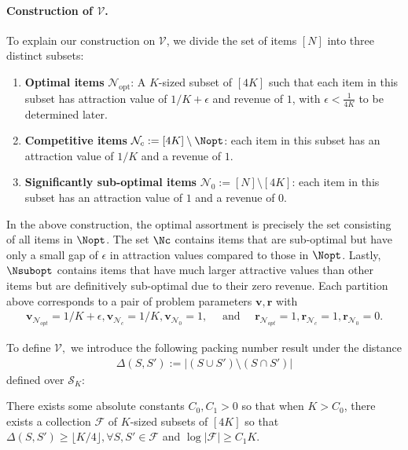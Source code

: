 \documentclass[10pt, letterpaper]{article}
\begin{document}
\paragraph{Construction of $\mathcal{V}$.} To explain our construction on $\mathcal{V}$, we divide the set of items $[N]$ into three distinct subsets:
\begin{enumerate}
    \item \textbf{Optimal items} $\mathcal{N}_{\text{opt}}$:  A $K$-sized subset of $[4K]$ such that each item in this subset has attraction value of $1/K + \epsilon$ and revenue of $1$, with $\epsilon <\frac{1}{4K}$ to be determined later.
    \item \textbf{Competitive items} $\mathcal{N}_{c} := [4K]\setminus \Nopt$: each item in this subset has an attraction value of $1/K$ and a revenue of $1$.
    \item \textbf{Significantly sub-optimal items} $\mathcal{N}_{0} := [N] \setminus [4K]$: each item in this subset has an attraction value of $1$ and a revenue of $0$.
\end{enumerate}
In the above construction, the optimal assortment is precisely the set consisting of all items in $\Nopt$. The set $\Nc$ contains items that are sub-optimal but have only a small gap of $\epsilon$ in attraction values compared to those in $\Nopt$. Lastly, $\Nsubopt$ contains items that have much larger attractive values than other items but are definitively sub-optimal due to their zero revenue. Each partition above corresponds to a pair of problem parameters $\bm v, \bm r$ with \begin{align*}
    \bm{v}_{\mathcal{N}_{opt}} = 1/K+\epsilon,   \bm{v}_{\mathcal{N}_{c}} = 1/K, \bm{v}_{\mathcal{N}_0} = 1,\quad \text{ and }\quad \bm{r}_{\mathcal{N}_{opt}} = 1,   \bm{r}_{\mathcal{N}_{c}} = 1, \bm{r}_{\mathcal{N}_0} = 0. 
\end{align*}


To define $\mathcal{V},$ we introduce the following packing number result under the distance 
\begin{align}\label{eq-dist-Delta}
\Delta(S,S'):= \lvert (S \cup S') \setminus (S\cap S') \rvert
\end{align}
defined over $\mathcal{S}_K:$
\begin{lemma}\label{lem-packing-number}
    There exists some absolute constants $C_0,C_1>0$ so that when $K>C_0$, there exists a collection $\mathcal{F}$ of $K$-sized subsets of $[4K]$ so that $\Delta(S,S') \geq \lfloor K/4 \rfloor ,  \forall S, S' \in \mathcal{F}$ and $\log \lvert \mathcal{F} \rvert \geq C_1 K.$
\end{lemma}
\end{document}
